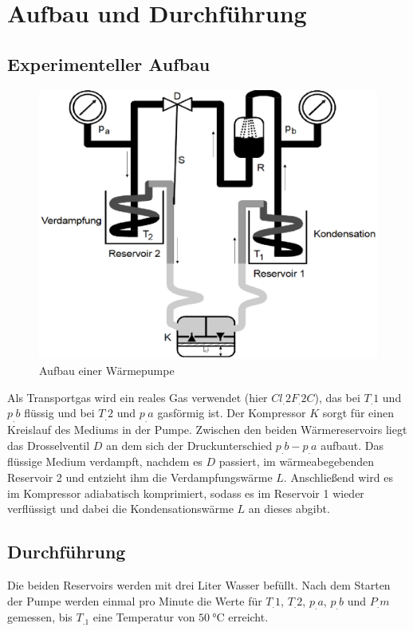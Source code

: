 
\section{Aufbau und Durchführung}
\label{sec:Durchführung}
\subsection{Experimenteller Aufbau}
\begin{figure}
\centering
\includegraphics[scale=0.5]{content/images/aufbau.eps}
\caption{Aufbau einer Wärmepumpe\cite{V206}}
\label{fig:abb1}
\end{figure}
\noindent Als Transportgas wird ein reales Gas verwendet (hier $Cl_.{2}F_.{2}C$), das bei $T_.{1}$ und $p_.{b}$ flüssig und bei $T_.{2}$ und $p_.{a}$ gasförmig ist.
Der Kompressor $K$ sorgt für einen Kreislauf des Mediums in der Pumpe.\newline
Zwischen den beiden Wärmereservoirs liegt das Drosselventil $D$
an dem sich der Druckunterschied $p_.{b}-p_.{a}$ aufbaut.\newline
Das flüssige Medium verdampft, nachdem es $D$ passiert, im wärmeabegebenden Reservoir 2 und entzieht ihm die Verdampfungswärme $L$.
Anschließend wird es im Kompressor adiabatisch komprimiert, sodass es im Reservoir 1 wieder verflüssigt und dabei die Kondensationswärme $L$ an dieses abgibt.
\subsection{Durchführung}
Die beiden Reservoirs werden mit drei Liter Wasser befüllt.\newline
Nach dem Starten der Pumpe werden einmal pro Minute die Werte für $T_.{1}$, $T_.{2}$, $p_.{a}$, $p_.{b}$ und $P_.{m}$ gemessen, bis $T_.1$ eine Temperatur von $\SI{50}{\celsius}$ erreicht.